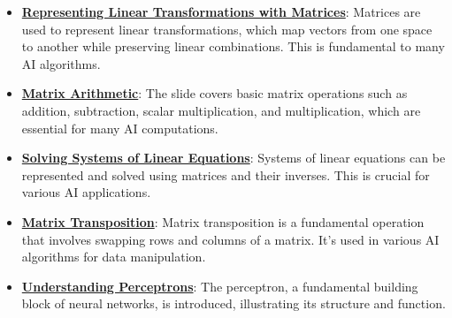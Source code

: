 \documentclass{article}%
\begin{document}
\begin{itemize}[leftmargin=*]%
\item \href{\url{https://purdue.brightspace.com/d2l/common/assets/pdfjs-d2l-dist/1.0.14-legacy/web/viewer.html?file=\%252Fcontent\%252Fenforced\%252F1095467-wl.202510.CS.24300.001\%252F04L1-Linear\%20Algebra\%20Primer.pdf\%253Fou\%253D1095467\&lang=en-us\&container=d2l-fileviewer-rendered-pdf\&fullscreen=d2l-fileviewer-rendered-pdf-dialog\&height=667}#page=5}{\textbf{Representing Linear Transformations with Matrices}}: Matrices are used to represent linear transformations, which map vectors from one space to another while preserving linear combinations. This is fundamental to many AI algorithms.%
\item \href{\url{https://purdue.brightspace.com/d2l/common/assets/pdfjs-d2l-dist/1.0.14-legacy/web/viewer.html?file=\%252Fcontent\%252Fenforced\%252F1095467-wl.202510.CS.24300.001\%252F04L1-Linear\%20Algebra\%20Primer.pdf\%253Fou\%253D1095467\&lang=en-us\&container=d2l-fileviewer-rendered-pdf\&fullscreen=d2l-fileviewer-rendered-pdf-dialog\&height=667}#page=9}{\textbf{Matrix Arithmetic}}: The slide covers basic matrix operations such as addition, subtraction, scalar multiplication, and multiplication, which are essential for many AI computations.%
\item \href{\url{https://purdue.brightspace.com/d2l/common/assets/pdfjs-d2l-dist/1.0.14-legacy/web/viewer.html?file=\%252Fcontent\%252Fenforced\%252F1095467-wl.202510.CS.24300.001\%252F04L1-Linear\%20Algebra\%20Primer.pdf\%253Fou\%253D1095467\&lang=en-us\&container=d2l-fileviewer-rendered-pdf\&fullscreen=d2l-fileviewer-rendered-pdf-dialog\&height=667}#page=11}{\textbf{Solving Systems of Linear Equations}}: Systems of linear equations can be represented and solved using matrices and their inverses. This is crucial for various AI applications.%
\item \href{\url{https://purdue.brightspace.com/d2l/common/assets/pdfjs-d2l-dist/1.0.14-legacy/web/viewer.html?file=\%252Fcontent\%252Fenforced\%252F1095467-wl.202510.CS.24300.001\%252F04L1-Linear\%20Algebra\%20Primer.pdf\%253Fou\%253D1095467\&lang=en-us\&container=d2l-fileviewer-rendered-pdf\&fullscreen=d2l-fileviewer-rendered-pdf-dialog\&height=667}#page=16}{\textbf{Matrix Transposition}}: Matrix transposition is a fundamental operation that involves swapping rows and columns of a matrix. It's used in various AI algorithms for data manipulation.%
\item \href{\url{https://purdue.brightspace.com/d2l/common/assets/pdfjs-d2l-dist/1.0.14-legacy/web/viewer.html?file=\%252Fcontent\%252Fenforced\%252F1095467-wl.202510.CS.24300.001\%252F04L1-Linear\%20Algebra\%20Primer.pdf\%253Fou\%253D1095467\&lang=en-us\&container=d2l-fileviewer-rendered-pdf\&fullscreen=d2l-fileviewer-rendered-pdf-dialog\&height=667}#page=17}{\textbf{Understanding Perceptrons}}: The perceptron, a fundamental building block of neural networks, is introduced, illustrating its structure and function.%

\end{itemize}
\end{document}
